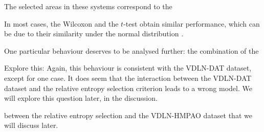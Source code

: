 The selected areas in these systems correspond to the 


In most cases, the Wilcoxon and the $t$-test obtain similar performance, which can be due to their similarity under the normal distribution \cite{Fay10}. 


One particular behaviour deserves to be analysed further: the combination of the 

Explore this: Again, this behaviour is consistent with the VDLN-DAT dataset, except for one case. It does seem that the interaction between the VDLN-DAT dataset and the relative entropy selection criterion leads to a wrong model. We will explore this question later, in the discussion. 


between the relative entropy selection and the VDLN-HMPAO dataset that we will discuss later. 